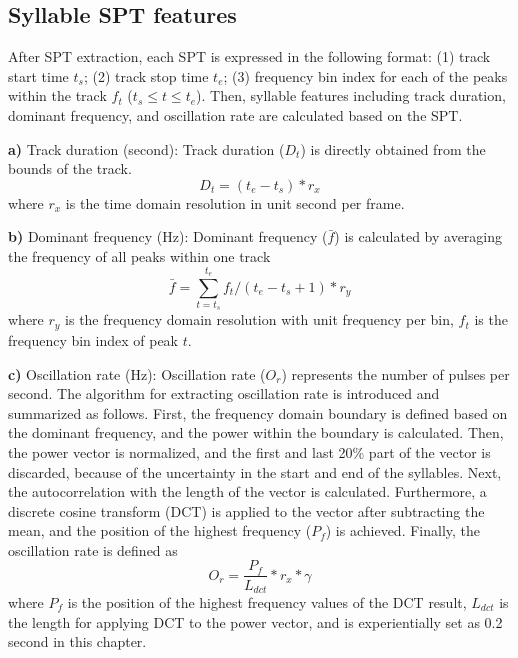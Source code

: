 \subsection{Syllable SPT features}

After SPT extraction, each SPT is expressed in the following format: (1) track start time $t_{s}$; (2) track stop time $t_{e}$; (3) frequency bin index for each of the peaks within the track $f_{t}$ ($t_{s} \leq t \leq t_{e}$).  Then, syllable features including track duration, dominant frequency, and oscillation rate are calculated based on the SPT.

\noindent \textbf{a)} Track duration (second):
Track duration ($D_{t}$) is directly obtained from the bounds of the track.
\begin{equation}
D_{t} = (t_{e}-t_{s})*r_{x}
\end{equation}
\noindent where $r_{x}$ is the time domain resolution in unit second per frame.

\noindent \textbf{b)} Dominant frequency (Hz): 
Dominant frequency ($\bar{f}$) is calculated by averaging the frequency of all peaks within one track
\begin{equation}
\bar{f} = \sum_{t=t_{s}}^{t_{e}}f_{t}/(t_{e}-t_{s}+1)*r_{y}
\end{equation}
where $r_{y}$ is the frequency domain resolution with unit frequency per bin, $f_{t}$ is the frequency bin index of peak $t$.

\noindent  \textbf{c)} Oscillation rate (Hz):  
Oscillation rate ($O_{r}$) represents the number of pulses per second. The algorithm for extracting oscillation rate is introduced and summarized as follows.
First, the frequency domain boundary is defined based on the dominant frequency, and the power within the boundary is calculated. Then, the power vector is normalized, and the first and last 20\% part of the vector is discarded, because of the uncertainty in the start and end of the syllables. Next, the autocorrelation with the length of the vector is calculated. Furthermore, a discrete cosine transform (DCT) is applied to the vector after subtracting the mean, and the position of the highest frequency ($P_{f}$) is achieved. Finally, the oscillation rate is defined as
\begin{equation}
O_{r}= \frac{P_{f}}{L_{dct}}*r_{x}*\gamma
\end{equation}
\noindent where $P_{f}$ is the position of the highest frequency values of the DCT result, $L_{dct}$ is the length for applying DCT to the power vector, and is experientially set as 0.2 second in this chapter. 




